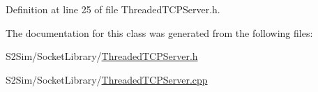 Definition at line 25 of file Threaded\-T\-C\-P\-Server.\-h.



The documentation for this class was generated from the following files\-:\begin{DoxyCompactItemize}
\item 
S2\-Sim/\-Socket\-Library/\hyperlink{_threaded_t_c_p_server_8h}{Threaded\-T\-C\-P\-Server.\-h}\item 
S2\-Sim/\-Socket\-Library/\hyperlink{_threaded_t_c_p_server_8cpp}{Threaded\-T\-C\-P\-Server.\-cpp}\end{DoxyCompactItemize}
